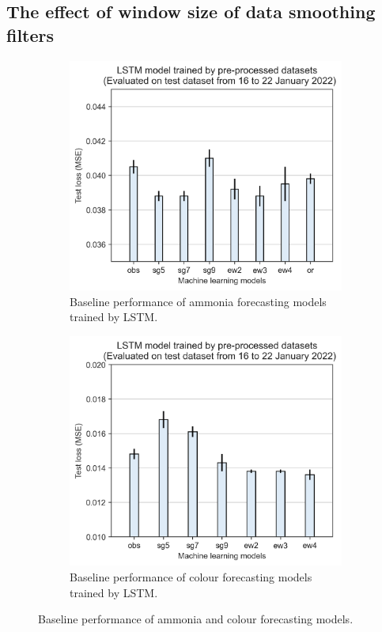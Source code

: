 \subsection{The effect of window size of data smoothing filters}

\begin{figure}[!ht]
  \centering
  \begin{subfigure}[t]{0.75\textwidth}
    \includegraphics[width=\linewidth]{imgs/results/feature-engineering/pre-processing-nh3-jan.png}
    \caption{Baseline performance of ammonia forecasting models trained by LSTM.} \label{fig:preprocessing-nh3}
  \end{subfigure}
  \hspace{2em}
  \begin{subfigure}[t]{0.75\textwidth}
    \includegraphics[width=\linewidth]{imgs/results/feature-engineering/pre-processing-colour.png}
    \caption{Baseline performance of colour forecasting models trained by LSTM.} \label{fig:preprocessing-colour}
  \end{subfigure}
\caption{Baseline performance of ammonia and colour forecasting models.} \label{fig:preprocessing-comparison}
\end{figure}


